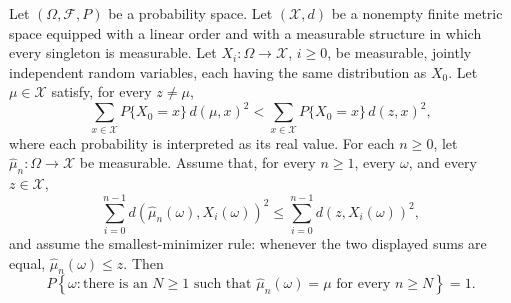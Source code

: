 \begin{theorem}
Let $(\Omega,\mathcal F,P)$ be a probability space.  Let
$(\mathcal X,d)$ be a nonempty finite metric space equipped with a linear
order and with a measurable structure in which every singleton is
measurable.  Let $X_i:\Omega\to\mathcal X$, $i\ge0$, be measurable,
jointly independent random variables, each having the same distribution as
$X_0$.  Let $\mu\in\mathcal X$ satisfy, for every $z\ne\mu$,
\[
 \sum_{x\in\mathcal X}P\{X_0=x\}\,d(\mu,x)^2
 <
 \sum_{x\in\mathcal X}P\{X_0=x\}\,d(z,x)^2,
\]
where each probability is interpreted as its real value.  For each
$n\ge0$, let $\widehat\mu_n:\Omega\to\mathcal X$ be measurable.  Assume
that, for every $n\ge1$, every $\omega$, and every $z\in\mathcal X$,
\[
 \sum_{i=0}^{n-1}d(\widehat\mu_n(\omega),X_i(\omega))^2
 \le
 \sum_{i=0}^{n-1}d(z,X_i(\omega))^2,
\]
and assume the smallest-minimizer rule: whenever the two displayed sums are
equal, $\widehat\mu_n(\omega)\le z$.  Then
\[
 P\left\{\omega:\text{there is an }N\ge1\text{ such that }
   \widehat\mu_n(\omega)=\mu\text{ for every }n\ge N\right\}=1.
\]
\end{theorem}

